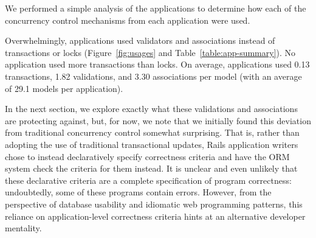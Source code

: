  We performed a simple analysis of the
applications to determine how each of the concurrency control
mechanisms from each application were used.

Overwhelmingly, applications used validators and associations instead
of transactions or locks (Figure~\ref{fig:usages} and
Table~\ref{table:app-summary}). No application used more transactions
than locks. On average, applications used 0.13 transactions, 1.82
validations, and 3.30 associations per model (with an average of 29.1
models per application).

In the next section, we explore exactly what these validations and
associations are protecting against, but, for now, we note that we
initially found this deviation from traditional concurrency control
somewhat surprising. That is, rather than adopting the use of
traditional transactional updates, Rails application writers chose to
instead declaratively specify correctness criteria and have the ORM
system check the criteria for them instead. It is unclear and even
unlikely that these declarative criteria are a complete specification
of program correctness: undoubtedly, some of these programs contain
errors. However, from the perspective of database usability and
idiomatic web programming patterns, this reliance on application-level
correctness criteria hints at an alternative developer mentality.

